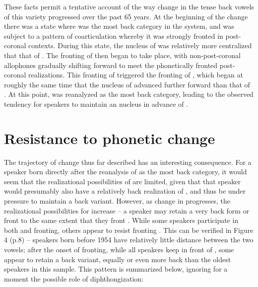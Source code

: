 \documentclass[12pt]{article}
\begin{document}
These facts permit a tentative account of the way change in the tense back vowels of this variety progressed over the past 65 years. At the beginning of the change there was a state where  was the most back category in the system, and was subject to a pattern of coarticulation whereby it was strongly fronted in post-coronal contexts. During this state, the nucleus of  was relatively more centralized that that of . The fronting of  then began to take place, with non-post-coronal allophones gradually shifting forward to meet the phonetically fronted post-coronal realizations. This fronting of  triggered the fronting of , which began at roughly the same time that the nucleus of  advanced further forward than that of . At this point,  was reanalyzed as the most back category, leading to the observed tendency for speakers to maintain an  nucleus in advance of .

\section{Resistance to phonetic change}

The trajectory of change thus far described has an interesting consequence. For a speaker born directly after the reanalysis of  as the most back category, it would seem that the realizational possibilities of  are limited, given that that speaker would presumably also have a relatively back realization of , and thus be under pressure to maintain a back  variant. However, as change in  progresses, the realizational possibilities for  increase -- a speaker may retain a very back form or front  to the same extent that they front . While some speakers participate in both  and  fronting, others appear to resist fronting . This can be verified in Figure 4 (p.8) -- speakers born before 1954 have relatively little distance between the two vowels; after the onset of  fronting, while all speakers keep  in front of , some appear to retain a back  variant, equally or even more back than the oldest speakers in this sample. This pattern is summarized below, ignoring for a moment the possible role of diphthongization:
\end{document}
